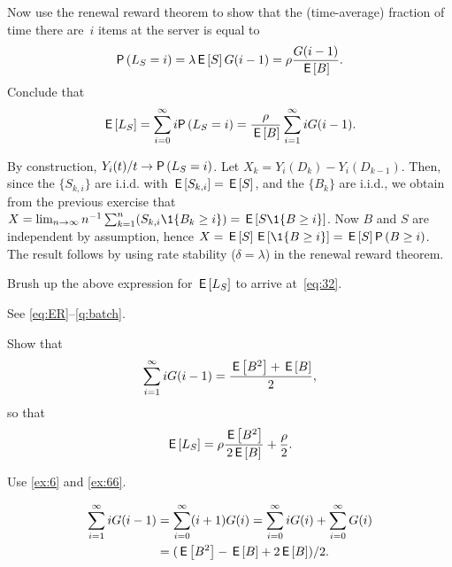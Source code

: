 \begin{exercise}
  Now use the renewal reward theorem to show that the (time-average) fraction of time there are~$i$ items at the server is equal to
  \begin{equation*}
    \P{L_S = i} = \lambda \E{S} G(i-1) = \rho \frac{G(i-1)}{\E B}.
  \end{equation*}
Conclude that
\begin{equation*}
  \E{L_S} = \sum_{i=0}^\infty i \P{L_S=i} = \frac{\rho}{\E B} \sum_{i=1}^\infty i G(i-1).
\end{equation*}
  \begin{solution}
    By construction, $Y_i(t)/t \to \P{L_S=i}$.
    Let $X_k = Y_i(D_k) - Y_i(D_{k-1})$.
    Then, since the $\{S_{k, i}\}$ are i.i.d. with $\,\mathsf{E}\left[S_{k,i}\right] = \,\mathsf{E}\left[S\right]$, 
      and the $\{B_k\}$ are i.i.d.,  we obtain from the previous exercise that $X = \lim_{n\to\infty} n^{-1}\sum_{k=1}^n (S_{k,i} \1{B_{k} \geq i}) = \E{S \1{B\geq i}}$.
      Now $B$ and $S$ are independent by assumption, hence $X = \E{S} \E{\1{B\geq i}} = \E S \P{B\geq i}$.
      The result follows by using rate stability ($\delta = \lambda$) in the renewal reward theorem.
  \end{solution}
\end{exercise}

\begin{exercise}
  Brush up the above expression for $\,\mathsf{E}\left[L_S\right]$  to arrive at~\cref{eq:32}.
  \begin{solution}
    See \cref{eq:ER}--\cref{q:batch}.
  \end{solution}
\end{exercise}


\begin{extra}\label{ex:ER}
  Show that
  \begin{equation*}
  \sum_{i=1}^\infty i G(i-1)= \frac{\,\mathsf{E}\left[B^2\right] + \,\mathsf{E}\left[B\right]}{2},
\end{equation*}
so that
\begin{equation*}
  \,\mathsf{E}\left[L_S\right] = \rho \frac{\,\mathsf{E}\left[B^2\right]}{2 \,\mathsf{E}\left[B\right]} + \frac{\rho}{2}.
\end{equation*}

  \begin{hint}
    Use \cref{ex:6} and \cref{ex:66}.
  \end{hint}
  \begin{solution}
\begin{equation*}
  \begin{split}
 \sum_{i=1}^\infty i G(i-1) 
&=\sum_{i=0}^\infty (i+1) G(i) 
=\sum_{i=0}^\infty i G(i) +
\sum_{i=0}^\infty G(i)\\
&= (\,\mathsf{E}\left[B^2\right] - \,\mathsf{E}\left[B\right] + 2\,\mathsf{E}\left[B\right])/2.
  \end{split}
\end{equation*}
  \end{solution}
\end{extra}



